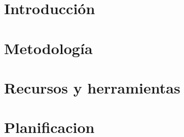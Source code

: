 \section{Introducción}


\section{Metodología}


\section{Recursos y herramientas}


\section{Planificacion}
